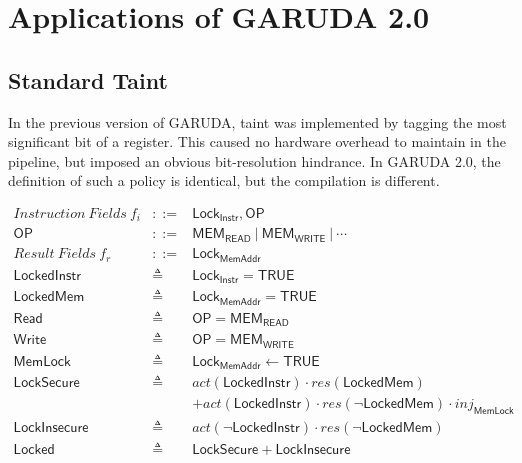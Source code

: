 \documentclass[12pt, letterpaper]{article}
\def \sysname {\textsc{GARUDA 2.0}\xspace}
\def \oldname {\textsc{GARUDA}\xspace}
\begin{document}

\section{Applications of \sysname}

\subsection{Standard Taint}

  In the previous version of \oldname, taint was implemented by tagging the most significant bit of a register. 
  This caused no hardware overhead to maintain in the pipeline, but imposed an obvious bit-resolution hindrance.
  In \sysname, the definition of such a policy is identical, but the compilation is different.

 \[
 \begin{array}{rcl}
   \mathit{Instruction\ Fields}\ f_i &::=& \mathsf{Lock_{Instr}}, \mathsf{OP}\\
   \mathsf{OP} &::=& \mathsf{MEM_{READ}}\ |\ \mathsf{MEM_{WRITE}}\ |\ \cdots \\
   \mathit{Result\ Fields}\ f_r &::=& \mathsf{Lock_{MemAddr}}\\
   \mathsf{LockedInstr} &\triangleq& \mathsf{Lock_{Instr}} = \mathsf{TRUE} \\
   \mathsf{LockedMem} &\triangleq& \mathsf{Lock_{MemAddr}} = \mathsf{TRUE} \\
   \mathsf{Read} &\triangleq& \mathsf{OP} = \mathsf{MEM_{READ}}\\
   \mathsf{Write} &\triangleq& \mathsf{OP} = \mathsf{MEM_{WRITE}}\\
   \mathsf{MemLock} &\triangleq& \mathsf{Lock_{MemAddr}} \leftarrow \mathsf{TRUE}\\ 
   \mathsf{LockSecure} &\triangleq& 
   act(\mathsf{LockedInstr})\cdot res(\mathsf{LockedMem})\\
   &&+
   act(\mathsf{LockedInstr})\cdot res(\neg \mathsf{LockedMem}) \cdot \mathit{inj_{\mathsf{MemLock}}} \\
   \mathsf{LockInsecure} &\triangleq&
    act(\neg \mathsf{LockedInstr})\cdot res(\neg \mathsf{LockedMem})\\
   \mathsf{Locked} &\triangleq& \mathsf{LockSecure} + \mathsf{LockInsecure}
 \end{array}
 \]\\
\end{document}
